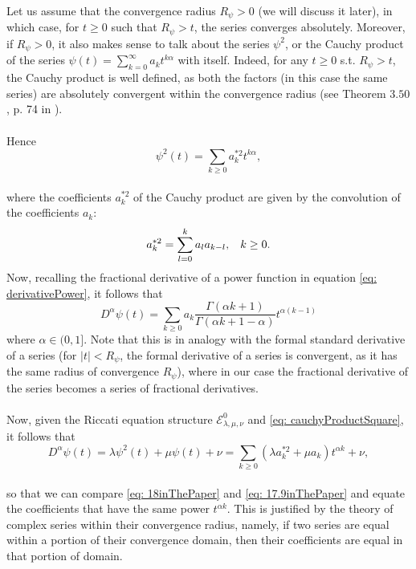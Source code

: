\documentclass[a4paper,italian,11pt]{book}
\theoremstyle{plain}
\theoremstyle{remark}
\theoremstyle{plain}
\begin{document}
    Let us assume that the convergence radius $R_\psi >0$ (we will discuss it later), in which case, for $t \ge 0$ such that $R_\psi> t$, the series converges absolutely. Moreover, if $R_\psi>0$, it also makes sense to talk about the series $\psi ^ 2$, or the Cauchy product of the series $\psi(t)= \sum_{k = 0}^\infty a_k t^{k\alpha}$ with itself. Indeed, for any $t \ge 0$ s.t. $R_\psi> t$, the Cauchy product is well defined, as both the factors (in this case the same series) are absolutely convergent within the convergence radius (see Theorem $3.50$, p. 74 in \cite{wikipediaMertens}).
\\\
\\
Hence
\begin{equation}
    \label{eq: cauchyProductSquare}
    \psi^2(t) = \sum_{k\ge 0} a_k^{*2}t^{k\alpha},
\end{equation}
\\
where the coefficients $a_k^{*2}$ of the Cauchy product are given by the convolution of the coefficients $a_k$:
\begin{equation}
    \label{eq: coefficientsConvolution}
    a_k^{*2} = \sum_{l=0}^k a_l a_{k-l},  \hspace{0.3cm} k \ge 0.
\end{equation}
\noindent
Now, recalling the fractional derivative of a power function in equation \eqref{eq: derivativePower}, it follows that
\begin{equation}
    \label{eq: 17.9inThePaper}
    D^\alpha \psi(t) = \sum_{k\ge 0} a_k \frac{\Gamma(\alpha k +1)}{\Gamma(\alpha k + 1 - \alpha)} t^{\alpha (k-1)} 
\end{equation}
where $\alpha \in (0,1]$. Note that this is in analogy with the formal standard derivative of a series (for $|t| < R_\psi$, the formal derivative of a series is convergent, as it has the same radius of convergence $R_\psi$),
where in our case the fractional derivative of the series becomes a series of fractional derivatives.
\\
\\
Now, given the Riccati equation structure $\mathcal{E}^0_{\lambda, \mu, \nu}$ and \eqref{eq: cauchyProductSquare}, it follows that
\begin{equation}
    \label{eq: 18inThePaper}
    D^\alpha \psi(t) = \lambda \psi^2(t) + \mu \psi(t) + \nu = \sum_{k\ge 0} (\lambda a_k^{*2} + \mu a_k)t^{\alpha k} + \nu,
\end{equation}
\\
so that we can compare \eqref{eq: 18inThePaper} and \eqref{eq: 17.9inThePaper} and equate the coefficients that have the same power $t^{\alpha k}$. This is justified by the theory of complex series within their convergence radius, namely, if two series are equal within a portion of their convergence domain, then their coefficients are equal in that portion of domain. 
\end{document}
